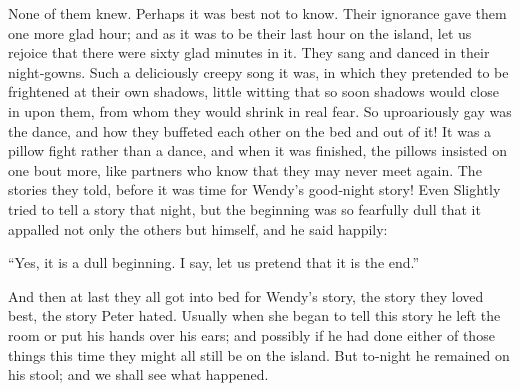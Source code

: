 None of them knew.
Perhaps it was best not to know.
Their ignorance gave them one more glad hour;
and as it was to be their last hour on the island,
let us rejoice that there were sixty glad minutes in it.
They sang and danced in their night‐gowns.
Such a deliciously creepy song it was,
in which they pretended to be frightened at their own shadows,
little witting that so soon shadows would close in upon them,
from whom they would shrink in real fear.
So uproariously gay was the dance,
and how they buffeted each other on the bed and out of it!
It was a pillow fight rather than a dance,
and when it was finished, the pillows insisted on one bout more,
like partners who know that they may never meet again.
The stories they told, before it was time for Wendy’s good‐night story!
Even Slightly tried to tell a story that night,
but the beginning was so fearfully dull that it appalled not only the others but himself,
and he said happily:

“Yes, it is a dull beginning.
I say, let us pretend that it is the end.”

And then at last they all got into bed for Wendy’s story,
the story they loved best, the story Peter hated.
Usually when she began to tell this story he left the room or put his hands over his ears;
and possibly if he had done either of those things this time they might all still be on the island.
But to‐night he remained on his stool;
and we shall see what happened.

\endinput
